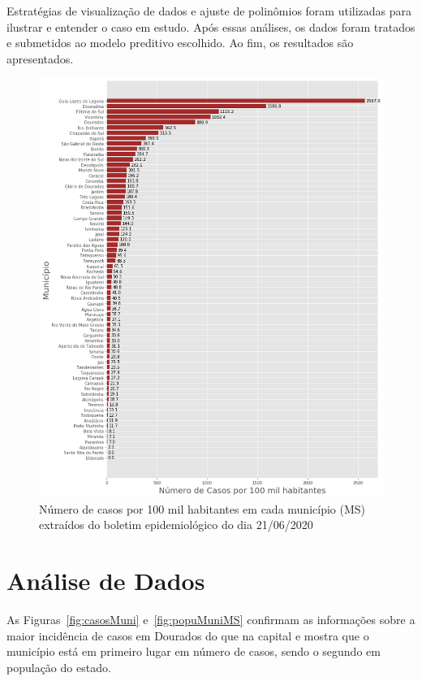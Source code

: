 \documentclass[12pt]{article}
\begin{document}
  Estratégias de visualização de dados e ajuste de polinômios foram utilizadas para ilustrar e entender o caso em estudo. Após essas análises, os dados foram tratados e submetidos ao modelo preditivo escolhido. Ao fim, os resultados são apresentados.

\begin{figure}[!htb]
  \centering
  \includegraphics[width=1\textwidth]{figs/casos_100_mil_por_municipio.png}
  \caption{Número de casos por 100 mil habitantes em cada município (MS) extraídos do boletim epidemiológico do dia 21/06/2020}
  \label{fig:casosMuni100k}
  \end{figure}

\section{Análise de Dados}\label{sec:dados}

As Figuras~\ref{fig:casosMuni} e~\ref{fig:popuMuniMS} confirmam as informações sobre a  maior incidência de casos em Dourados do que na capital e mostra que o município está em primeiro lugar em número de casos, sendo o segundo em população do estado.
\end{document}
